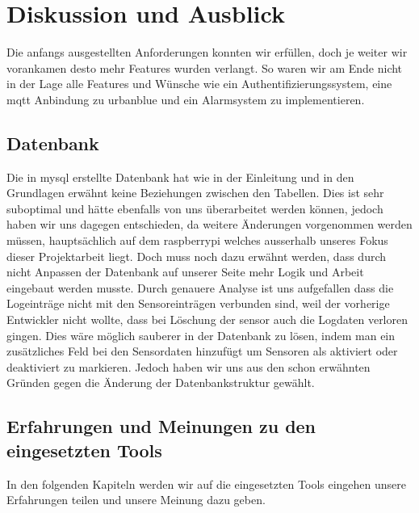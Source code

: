 \documentclass[../main.tex]{subfiles}
\begin{document}
	\section{Diskussion und Ausblick}
	Die anfangs ausgestellten Anforderungen konnten wir erfüllen, doch je weiter wir vorankamen desto mehr Features wurden verlangt. So waren wir am Ende nicht in der Lage alle Features und Wünsche wie ein Authentifizierungssystem, eine \gls{mqtt}\cite{MQTT} Anbindung zu \gls{urbanblue}\cite{Urbanblue} und ein Alarmsystem zu implementieren.\\
	\par
	\noindent

	\subsection{Datenbank}
	Die in \gls{mysql} erstellte Datenbank hat wie in der Einleitung und in den Grundlagen erwähnt keine Beziehungen zwischen den Tabellen. Dies ist sehr suboptimal und hätte ebenfalls von uns überarbeitet werden können, jedoch haben wir uns dagegen entschieden, da weitere Änderungen vorgenommen werden müssen, hauptsächlich auf dem \gls{raspberrypi} welches ausserhalb unseres Fokus dieser Projektarbeit liegt. Doch muss noch dazu erwähnt werden, dass durch nicht Anpassen der Datenbank auf unserer Seite mehr Logik und Arbeit eingebaut werden musste. Durch genauere Analyse ist uns aufgefallen dass die Logeinträge nicht mit den Sensoreinträgen verbunden sind, weil der vorherige Entwickler nicht wollte, dass bei Löschung der \gls{sensor} auch die Logdaten verloren gingen. Dies wäre möglich sauberer in der Datenbank zu lösen, indem man ein zusätzliches Feld bei den Sensordaten hinzufügt um Sensoren als aktiviert oder deaktiviert zu markieren. Jedoch haben wir uns aus den schon erwähnten Gründen gegen die Änderung der Datenbankstruktur gewählt.
	
	\subsection{Erfahrungen und Meinungen zu den eingesetzten Tools}
	In den folgenden Kapiteln werden wir auf die eingesetzten Tools eingehen unsere Erfahrungen teilen und unsere Meinung dazu geben.
	
\end{document}
